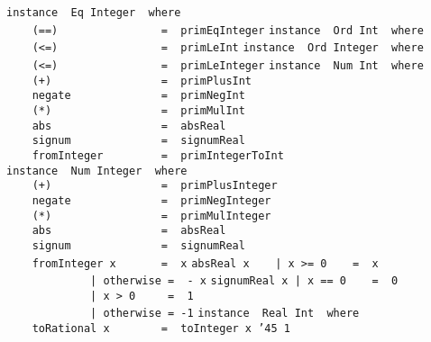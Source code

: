 \eprogB\noindent\bprogB
\mbox{\tt instance\ \ Eq\ Integer\ \ where}\\
\mbox{\tt \ \ \ \ (==)\ \ \ \ \ \ \ \ \ \ \ \ \ \ \ \ =\ \ primEqInteger}
\eprogB\noindent\bprogB
\mbox{\tt instance\ \ Ord\ Int\ \ where}\\
\mbox{\tt \ \ \ \ (<=)\ \ \ \ \ \ \ \ \ \ \ \ \ \ \ \ =\ \ primLeInt}
\eprogB\noindent\bprogB
\mbox{\tt instance\ \ Ord\ Integer\ \ where}\\
\mbox{\tt \ \ \ \ (<=)\ \ \ \ \ \ \ \ \ \ \ \ \ \ \ \ =\ \ primLeInteger}
\eprogB\noindent\bprogB
\mbox{\tt instance\ \ Num\ Int\ \ where}\\
\mbox{\tt \ \ \ \ (+)\ \ \ \ \ \ \ \ \ \ \ \ \ \ \ \ \ =\ \ primPlusInt}\\
\mbox{\tt \ \ \ \ negate\ \ \ \ \ \ \ \ \ \ \ \ \ \ =\ \ primNegInt}\\
\mbox{\tt \ \ \ \ (*)\ \ \ \ \ \ \ \ \ \ \ \ \ \ \ \ \ =\ \ primMulInt}\\
\mbox{\tt \ \ \ \ abs\ \ \ \ \ \ \ \ \ \ \ \ \ \ \ \ \ =\ \ absReal}\\
\mbox{\tt \ \ \ \ signum\ \ \ \ \ \ \ \ \ \ \ \ \ \ =\ \ signumReal}\\
\mbox{\tt \ \ \ \ fromInteger\ \ \ \ \ \ \ \ \ =\ \ primIntegerToInt}
\eprogB\noindent\bprogB
\mbox{\tt instance\ \ Num\ Integer\ \ where}\\
\mbox{\tt \ \ \ \ (+)\ \ \ \ \ \ \ \ \ \ \ \ \ \ \ \ \ =\ \ primPlusInteger}\\
\mbox{\tt \ \ \ \ negate\ \ \ \ \ \ \ \ \ \ \ \ \ \ =\ \ primNegInteger}\\
\mbox{\tt \ \ \ \ (*)\ \ \ \ \ \ \ \ \ \ \ \ \ \ \ \ \ =\ \ primMulInteger}\\
\mbox{\tt \ \ \ \ abs\ \ \ \ \ \ \ \ \ \ \ \ \ \ \ \ \ =\ \ absReal}\\
\mbox{\tt \ \ \ \ signum\ \ \ \ \ \ \ \ \ \ \ \ \ \ =\ \ signumReal}\\
\mbox{\tt \ \ \ \ fromInteger\ x\ \ \ \ \ \ \ =\ \ x}
\eprogB\noindent\bprogB
\mbox{\tt absReal\ x\ \ \ \ |\ x\ >=\ 0\ \ \ \ =\ \ x}\\
\mbox{\tt \ \ \ \ \ \ \ \ \ \ \ \ \ |\ otherwise\ =\ \ -\ x}
\eprogB\noindent\bprogB
\mbox{\tt signumReal\ x\ |\ x\ ==\ 0\ \ \ \ =\ \ 0}\\
\mbox{\tt \ \ \ \ \ \ \ \ \ \ \ \ \ |\ x\ >\ 0\ \ \ \ \ =\ \ 1}\\
\mbox{\tt \ \ \ \ \ \ \ \ \ \ \ \ \ |\ otherwise\ =\ -1}
\eprogB\noindent\bprogB
\mbox{\tt instance\ \ Real\ Int\ \ where}\\
\mbox{\tt \ \ \ \ toRational\ x\ \ \ \ \ \ \ \ =\ \ toInteger\ x\ {\char'45}\ 1}
